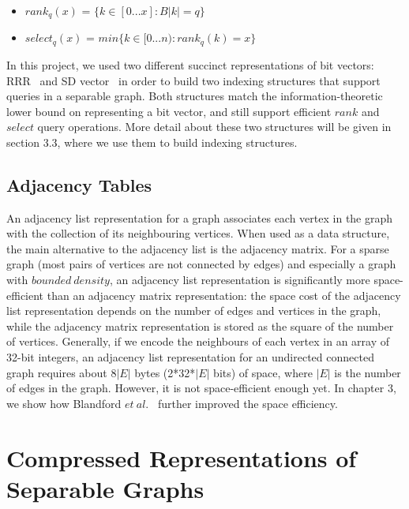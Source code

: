 \documentclass[12pt,glossary]{dalthesis}
\begin{document}
\begin{itemize}[noitemsep]
\item $rank_{q}(x)$ = $\{k \in [0...x] : B|k| = q \}$
\item $select_{q}(x)$ = $ min \{ k \in [0...n) : rank_{q}(k) = x \} $ 
\end{itemize}


In this project, we used two different succinct representations of bit vectors: RRR~\cite{RRR} and SD vector~\cite{SD-vector} in order to build two indexing structures that support queries in a separable graph. Both structures match the information-theoretic lower bound on representing a bit vector, and still support efficient $rank$ and $select$ query operations. More detail about these two structures will be given in section 3.3, where we use them to build indexing structures.

\bigskip
\bigskip
\section{Adjacency Tables}
An adjacency list representation for a graph associates each vertex in the graph with the collection of its neighbouring vertices. When used as a data structure, the main alternative to the adjacency list is the adjacency matrix. For a sparse graph (most pairs of vertices are not connected by edges) and especially a graph with $bounded \ density$, an adjacency list representation is significantly more space-efficient than an adjacency matrix representation: the space cost of the adjacency list representation depends on the number of edges and vertices in the graph, while the adjacency matrix representation is stored as the square of the number of vertices. Generally, if we encode the neighbours of each vertex in an array of 32-bit integers, an adjacency list representation for an undirected connected graph requires about 8$|E|$ bytes (2*32*$|E|$ bits) of space, where $|E|$ is the number of edges in the graph. However, it is not space-efficient enough yet. In chapter 3, we show how Blandford $et \ al.$~\cite{compact-representation} further improved the space efficiency.



\chapter{Compressed Representations of Separable Graphs}
\end{document}
